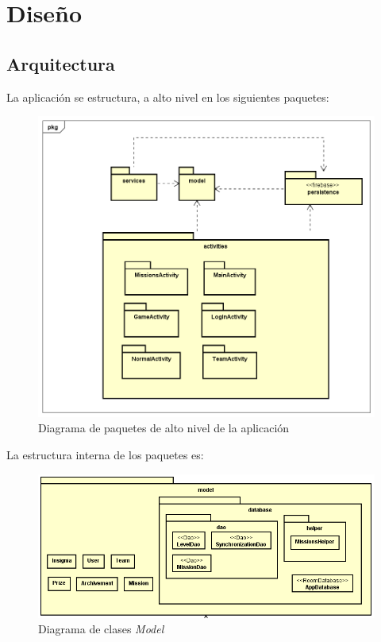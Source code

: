 \documentclass[twoside]{report}
\begin{document}
\section{Diseño}
\subsection{Arquitectura}
La aplicación se estructura, a alto nivel en los siguientes paquetes:
\begin{figure}[H]
\centering
\includegraphics[scale=0.5]{images/structureHighLevel}
\caption{Diagrama de paquetes de alto nivel de la aplicación}
\end{figure}

La estructura interna de los paquetes es:

\begin{figure}[H]
\centering
\includegraphics[scale=0.6]{images/structureModel}
\caption{Diagrama de clases \textit{Model}}
\end{figure}
\end{document}
